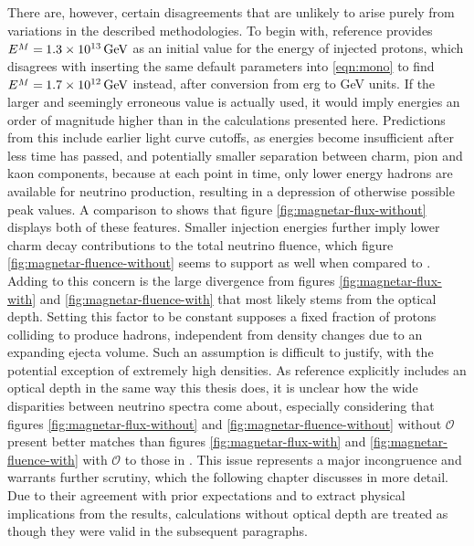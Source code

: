 There are, however, certain disagreements that are unlikely to arise purely from variations in the described methodologies. To begin with,
reference \cite{Carpio_2020} provides $\cramped{E^M} = \kern-0.5pt \smash{\qty{1.3e13}{\giga\electronvolt}}$ as an initial value for the
energy of injected protons, which disagrees with inserting the same default parameters into \eqref{eqn:mono} to find
$\cramped{E^M} = \kern-0.5pt \smash{\qty{1.7e12}{\giga\electronvolt}}$ instead, after conversion from \unit{erg} to \unit{\giga\electronvolt}
units. If the larger and seemingly erroneous value is actually used, it would imply energies an order of magnitude higher than in the
calculations presented here. Predictions from this include earlier light curve cutoffs, as energies become insufficient after less time
has passed, and potentially smaller separation between charm, pion and kaon components, because at each point in time, only lower
energy hadrons are available for neutrino production, resulting in a depression of otherwise possible peak values. A comparison to
\cite{Carpio_2020} shows that figure \ref{fig:magnetar-flux-without} displays both of these features. Smaller injection energies
further imply lower charm decay contributions to the total neutrino fluence, which figure \ref{fig:magnetar-fluence-without} seems
to support as well when compared to \cite{Carpio_2020}. Adding to this concern is the large divergence from figures
\ref{fig:magnetar-flux-with} and \ref{fig:magnetar-fluence-with} that most likely stems from the optical depth. Setting this
factor to be constant supposes a fixed fraction of protons colliding to produce hadrons, independent from density changes
due to an expanding ejecta volume. Such an assumption is difficult to justify, with the potential exception
of extremely high densities. As reference \cite{Carpio_2020} explicitly includes an optical depth in the same way
this thesis does, it is unclear how the wide disparities between neutrino spectra come about, especially
considering that figures \ref{fig:magnetar-flux-without} and \ref{fig:magnetar-fluence-without} without $\mathscr{O}$ present
better matches than figures \ref{fig:magnetar-flux-with} and \ref{fig:magnetar-fluence-with} with $\mathscr{O}$ to those in \cite{Carpio_2020}.
This issue represents a major incongruence and warrants further scrutiny, which the following chapter discusses in more detail. Due to their
agreement with prior expectations and to extract physical implications from the results, calculations without optical depth are treated as
though they were valid in the subsequent paragraphs.

